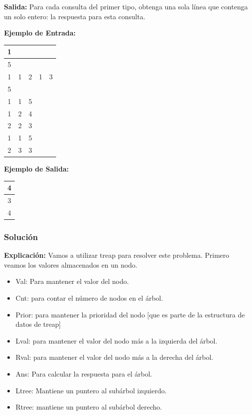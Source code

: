 \documentclass[12pt]{article}
\newcommand{\nl}{\vspace{0.3cm}}
\begin{document}
\nl

\textbf{Salida:} Para cada consulta del primer tipo, obtenga una sola línea que contenga un solo entero: la respuesta para esta consulta.

\nl

\textbf{Ejemplo de Entrada:}

\nl

\begin{tabular}{|c|c|c|c|c|}
	\hline 1 &  &  &  &  \\ 
	\hline 5 &  &  &  &  \\ 
	\hline 1 & 1 & 2 & 1 & 3 \\ 
	\hline 5 &  &  &  &  \\ 
	\hline 1 & 1 & 5 &  &  \\ 
	\hline 1 & 2 & 4 &  &  \\ 
	\hline 2 & 2 & 3 &  &  \\ 
	\hline 1 & 1 & 5 &  &  \\ 
	\hline 2 & 3 & 3 &  &  \\ 
	\hline 
\end{tabular} 

\nl

\textbf{Ejemplo de Salida:}

\nl

\begin{tabular}{|c|}
	\hline 4 \\ 
	\hline 3 \\ 
	\hline 4 \\ 
	\hline 
\end{tabular} 

\nl

\subsubsection{Solución}

\textbf{Explicación:} Vamos a utilizar treap para resolver este problema. Primero veamos los valores almacenados en un nodo.

\begin{itemize}
	\item Val: Para mantener el valor del nodo.
	\item Cnt: para contar el número de nodos en el árbol.
	\item Prior: para mantener la prioridad del nodo [que es parte de la estructura de datos de treap]
	\item Lval: para mantener el valor del nodo más a la izquierda del árbol.
	\item Rval: para mantener el valor del nodo más a la derecha del árbol.
	\item Ans: Para calcular la respuesta para el árbol.
	\item Ltree: Mantiene un puntero al subárbol izquierdo.
	\item Rtree: mantiene un puntero al subárbol derecho.	
\end{itemize}
\end{document}
